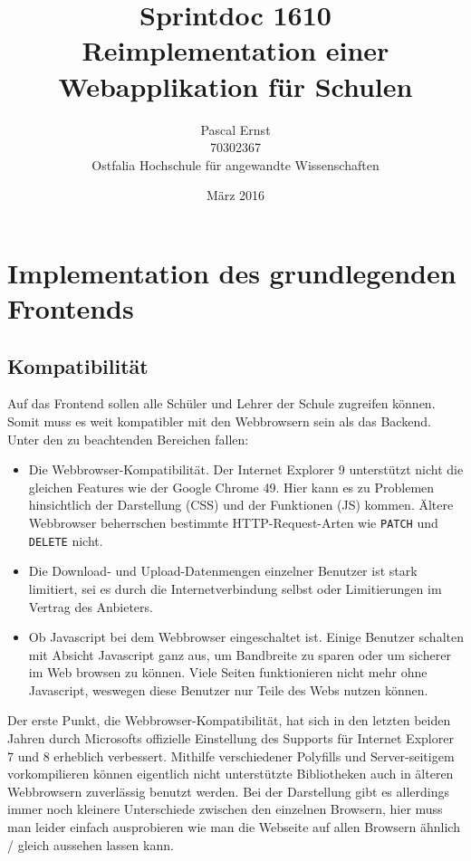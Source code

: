 \documentclass[a4paper,10pt]{scrartcl}
\begin{document}
\title{Sprintdoc 1610 \\
  Reimplementation einer Webapplikation für Schulen}
\author{Pascal Ernst\\
  70302367 \\
  Ostfalia Hochschule für angewandte Wissenschaften}
\date{März 2016}
\maketitle

\newpage

\section{Implementation des grundlegenden Frontends}

  \subsection{Kompatibilität}

    Auf das Frontend sollen alle Schüler und Lehrer der Schule zugreifen können.
    Somit muss es weit kompatibler mit den Webbrowsern sein als das Backend.
    Unter den zu beachtenden Bereichen fallen:

    \begin{itemize}
      \item Die Webbrowser-Kompatibilität. Der Internet Explorer 9 unterstützt
        nicht die gleichen Features wie der Google Chrome 49. Hier kann es zu
        Problemen hinsichtlich der Darstellung (CSS) und der Funktionen (JS)
        kommen.
        Ältere Webbrowser beherrschen bestimmte HTTP-Request-Arten wie
        \lstinline{PATCH} und \lstinline{DELETE} nicht.
      \item Die Download- und Upload-Datenmengen einzelner Benutzer ist stark
        limitiert, sei es durch die Internetverbindung selbst oder Limitierungen
        im Vertrag des Anbieters.
      \item Ob Javascript bei dem Webbrowser eingeschaltet ist. Einige Benutzer
        schalten mit Absicht Javascript ganz aus, um Bandbreite zu sparen oder
        um sicherer im Web browsen zu können.
        Viele Seiten funktionieren nicht mehr ohne Javascript, weswegen diese
        Benutzer nur Teile des Webs nutzen können.
    \end{itemize}

    Der erste Punkt, die Webbrowser-Kompatibilität, hat sich in den letzten
    beiden Jahren durch Microsofts offizielle Einstellung des Supports für
    Internet Explorer 7 und 8 erheblich verbessert.
    Mithilfe verschiedener Polyfills und Server-seitigem vorkompilieren können
    eigentlich nicht unterstützte Bibliotheken auch in älteren Webbrowsern
    zuverlässig benutzt werden.
    Bei der Darstellung gibt es allerdings immer noch kleinere Unterschiede
    zwischen den einzelnen Browsern, hier muss man leider einfach ausprobieren
    wie man die Webseite auf allen Browsern ähnlich / gleich aussehen lassen
    kann.
\end{document}
